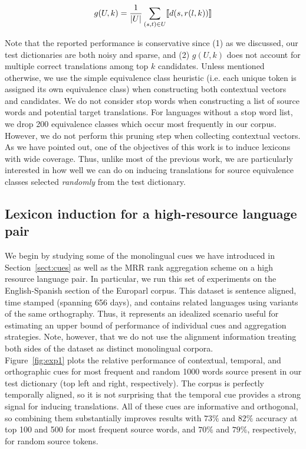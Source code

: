 \documentclass{article}
\newcommand{\secref}[1]{Section~\ref{#1}}
\newcommand{\figref}[1]{Figure~\ref{#1}}
\begin{document}
\begin{equation*}
  g(U, k) = {1 \over |U|}\sum_{(s,t) \in U} \llbracket d(s, r(l, k))\rrbracket
\end{equation*}

Note that the reported performance is conservative since (1) as we discussed, our test dictionaries are both noisy and sparse, and (2) $g(U, k)$ does not account for multiple correct translations among top $k$ candidates. Unless mentioned otherwise, we use the simple equivalence class heuristic (i.e. each unique token is assigned its own equivalence class) when constructing both contextual vectors and candidates.  We do not consider stop words when constructing a list of source words and potential target translations.  For languages without a stop word list, we drop 200 equivalence classes which occur most frequently in our corpus.  However, we do not perform this pruning step when collecting contextual vectors. \\

As we have pointed out, one of the objectives of this work is to induce lexicons with wide coverage.  Thus, unlike most of the previous work, we are particularly interested in how well we can do on inducing translations for source equivalence classes selected \emph{randomly} from the test dictionary.

\subsection{Lexicon induction for a high-resource language pair} \label{sect:exphigh}

We begin by studying some of the monolingual cues we have introduced in \secref{sect:cues} as well as the MRR rank aggregation scheme on a high resource language pair.  In particular, we run this set of experiments on the English-Spanish section of the Europarl corpus.  This dataset is sentence aligned,  time stamped (spanning 656 days), and contains related languages using variants of the same orthography.  Thus, it represents an idealized scenario useful for estimating an upper bound of performance of individual cues and aggregation strategies.  Note, however, that we do not use the alignment information treating both sides of the dataset as distinct monolingual corpora.\\

\figref{fig:exp1} plots the relative performance of contextual, temporal, and orthographic cues for most frequent and random 1000 words source present in our test dictionary (top left and right, respectively).  The corpus is perfectly temporally aligned, so it is not surprising that the temporal cue provides a strong signal for inducing translations.  All of these cues are informative and orthogonal, so combining them substantially improves results with $73\%$ and  $82\%$ accuracy at top 100 and 500 for most frequent source words, and $70\%$ and  $79\%$, respectively, for random source tokens.  \\
\end{document}
